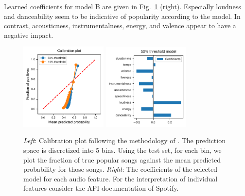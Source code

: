 \documentclass{article}
\begin{document}
Learned coefficients for model B are given in Fig.~\ref{fig:logis_eval} (right). Especially loudness and danceability seem to be indicative of popularity according to the model. In contrast, acousticness, instrumentalness, energy, and valence appear to have a negative impact.


\begin{figure}
  \centering
  \includegraphics[width=0.39\textwidth]{../figures/calibration_combined.pdf}
  \qquad
  \includegraphics[width=0.39\textwidth]{../figures/logistic_coefs_50_threshold_model.pdf}
  \caption{\textit{Left}: Calibration plot following the methodology of \cite{niculescu-mizilPredictingGoodProbabilities2005}. The prediction space is discretized into 5 bins. Using the test set, for each bin, we plot the fraction of true popular songs against the mean predicted probability for those songs. \textit{Right}: The coefficients of the selected model for each audio feature. For the interpretation of individual features consider the API documentation of Spotify.}
  \label{fig:logis_eval}
\end{figure}
\end{document}
